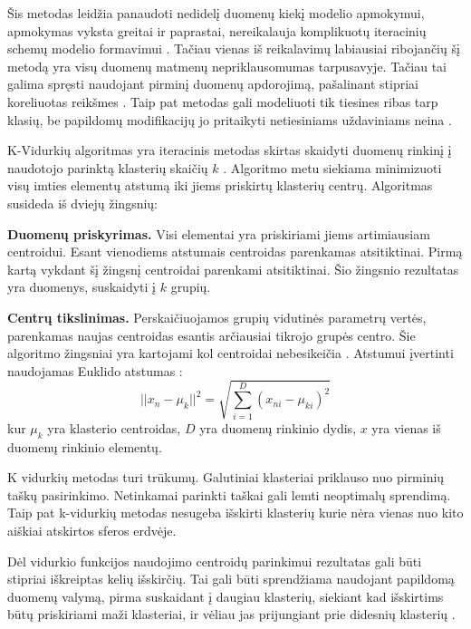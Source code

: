   Šis metodas leidžia panaudoti nedidelį duomenų kiekį modelio apmokymui, apmokymas vyksta greitai ir paprastai, nereikalauja komplikuotų iteracinių schemų modelio formavimui \cite{Wu2008}. Tačiau vienas iš reikalavimų labiausiai ribojančių šį metodą yra visų duomenų matmenų nepriklausomumas tarpusavyje. Tačiau tai galima spręsti naudojant pirminį duomenų apdorojimą, pašalinant stipriai koreliuotas reikšmes \cite{Wu2008}. Taip pat metodas gali modeliuoti tik tiesines ribas tarp klasių, be papildomų modifikacijų jo pritaikyti netiesiniams uždaviniams neina \cite{comp}.

 K-Vidurkių algoritmas yra iteracinis metodas skirtas skaidyti duomenų rinkinį į naudotojo parinktą klasterių skaičių $k$ \cite{Wu2008}. Algoritmo metu siekiama minimizuoti visų imties elementų atstumą iki jiems priskirtų klasterių centrų. Algoritmas susideda iš dviejų žingsnių:

 \textbf{Duomenų priskyrimas.} Visi elementai yra priskiriami jiems artimiausiam centroidui. Esant vienodiems atstumais centroidas parenkamas atsitiktinai. Pirmą kartą vykdant šį žingsnį centroidai parenkami atsitiktinai. Šio žingsnio rezultatas yra duomenys, suskaidyti į $k$ grupių.

 \textbf{Centrų tikslinimas.} Perskaičiuojamos grupių vidutinės parametrų vertės, parenkamas naujas centroidas esantis arčiausiai tikrojo grupės centro.
 Šie algoritmo žingsniai yra kartojami kol centroidai nebesikeičia \cite{Wu2008}. Atstumui įvertinti naudojamas Euklido atstumas \cite{comp}:
   \begin{equation}
   ||x_n - \mu_k||^2 = \sqrt{\sum_{i=1}^{D}(x_{ni} - \mu_{ki})^2}
   \end{equation}
   kur $\mu_k$ yra klasterio centroidas, $D$ yra duomenų rinkinio dydis, $x$ yra vienas iš duomenų rinkinio elementų.

   K vidurkių metodas turi trūkumų. Galutiniai klasteriai priklauso nuo pirminių taškų pasirinkimo. Netinkamai parinkti taškai gali lemti neoptimalų sprendimą. Taip pat k-vidurkių metodas nesugeba išskirti klasterių kurie nėra vienas nuo kito aiškiai atskirtos sferos erdvėje.

   Dėl vidurkio funkcijos naudojimo centroidų parinkimui rezultatas gali būti stipriai iškreiptas kelių išskirčių. Tai gali būti sprendžiama naudojant papildomą duomenų valymą, pirma suskaidant į daugiau klasterių, siekiant kad išskirtims būtų priskiriami maži klasteriai, ir vėliau jas prijungiant prie didesnių klasterių \cite{Wu2008}.


